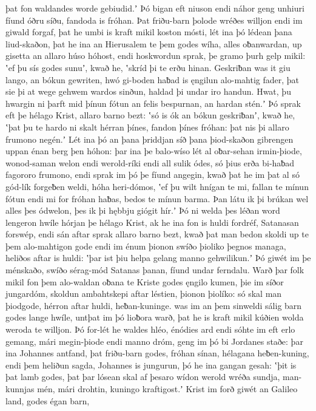 þat fon waldandes worde gebiudid.ʼ
Þó bigan eft niuson endi náhor geng
unhiuri fíund óðru síðu,
fandoda is fróhan. Þat friðu-barn þolode
wréðes willjon endi im giwald forgaf,
þat he umbi is kraft mikil koston mósti,
lét ina þó lédean þana liud-skaðon,
þat he ina an Hierusalem te þem godes wíha,
alles oƀanwardan, up gisetta
an allaro húso hóhost, endi hoskwordun sprak,
þe gramo þurh gelp mikil: ʽef þu sís godes sunuʼ, kwað he,
ʽskríd þi te erðu hinan. Geskriƀan was it giu lango,
an bókun gewriten, hwó gi-boden haƀad
is ęngilun alo-mahtig fader,
þat sie þi at wege gehwem wardos sinðun,
haldad þi undar iro handun. Hwat, þu hwargin ni þarft
mid þínun fótun an felis bespurnan,
an hardan stén.ʼ Þó sprak eft þe hélago Krist,
allaro barno bezt: ʽsó is ók an bókun geskriƀanʼ, kwað he,
ʽþat þu te hardo ni skalt hérran þínes,
fandon þínes fróhan: þat nis þi allaro frumono negén.ʼ
Lét ina þó an þana þriddjan síð þana þiod-skaðon
gibrengen uppan énan berg þen hóhon: þar ina þe balo-wíso
lét al oƀar-sehan irmin-þiode,
wonod-saman welon endi werold-ríki
endi all sulik ódes, só þius erða bi-haƀad
fagororo frumono, endi sprak im þó þe fíund angegin,
kwað þat he im þat al só gód-lík forgeƀen weldi,
hóha heri-dómos, ʽef þu wilt hnígan te mi,
fallan te mínun fótun endi mi for fróhan haƀas,
bedos te mínun barma. Þan látu ik þi brúkan wel
alles þes ódwelon, þes ik þi hębbju giógit hír.ʼ
Þó ni welda þes léðan word lengeron hwíle
hórjan þe hélago Krist, ak he ina fon is huldi fordréf,
Satanasan forswép, endi sán aftar sprak
allaro barno bezt, kwað þat man bedon skoldi
up te þem alo-mahtigon gode endi im énum þionon
swíðo þioliko þegnos managa,
heliðos aftar is huldi: ʽþar ist þiu helpa gelang
manno gehwilikun.ʼ Þó giwét im þe ménskaðo,
swíðo sérag-mód Satanas þanan,
fíund undar ferndalu. Warð þar folk mikil
fon þem alo-waldan oƀana te Kriste
godes ęngilo kumen, þie im síðor jungardóm,
skoldun ambahtskepi aftar léstien,
þionon þiolíko: só skal man þiodgode,
hérron aftar huldi, heƀan-kuninge.
was im an þem sinweldi sálig barn godes
lange hwíle, untþat im þó lioƀora warð,
þat he is kraft mikil kúðien wolda
weroda te willjon. Þó for-lét he waldes hléo,
énódies ard endi sóhte im eft erlo gemang,
mári megin-þiode endi manno dróm,
geng im þó bi Jordanes staðe: þar ina Johannes antfand,
þat friðu-barn godes, fróhan sínan,
hélagana heƀen-kuning, endi þem heliðun sagda,
Johannes is jungurun, þó he ina gangan gesah:
ʽþit is þat lamb godes, þat þar lósean skal
af þesaro wídon werold wréða sundja,
man-kunnjas mén, mári drohtin,
kuningo kraftigost.ʼ Krist im forð giwét
an Galileo land, godes égan barn,
